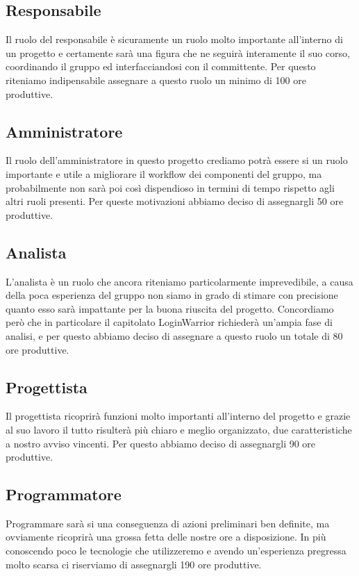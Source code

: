 \subsection{Responsabile}
Il ruolo del responsabile è sicuramente un ruolo molto importante all'interno di un progetto e certamente sarà una figura che ne
seguirà interamente il suo corso, coordinando il gruppo ed interfacciandosi con il committente.
Per questo riteniamo indipensabile assegnare a questo ruolo un minimo di 100 ore produttive. 

\subsection{Amministratore}
Il ruolo dell'amministratore in questo progetto crediamo potrà essere si un ruolo importante e utile a migliorare il workflow dei componenti del gruppo, ma probabilmente non sarà poi così dispendioso
in termini di tempo rispetto agli altri ruoli presenti. Per queste motivazioni abbiamo deciso di assegnargli 50 ore produttive.

\subsection{Analista}
L'analista è un ruolo che ancora riteniamo particolarmente imprevedibile, a causa della poca esperienza del gruppo non siamo in grado di stimare con precisione quanto esso sarà impattante per la buona
riuscita del progetto. Concordiamo però che in particolare il capitolato LoginWarrior richiederà un'ampia fase di analisi, e per questo abbiamo deciso di assegnare a questo ruolo un totale di 80 ore produttive.

\subsection{Progettista}
Il progettista ricoprirà funzioni molto importanti all'interno del progetto e grazie al suo lavoro il tutto risulterà più chiaro e meglio organizzato, due caratteristiche a nostro avviso vincenti.
Per questo abbiamo deciso di assegnargli 90 ore produttive.

\subsection{Programmatore}
Programmare sarà si una conseguenza di azioni preliminari ben definite, ma ovviamente ricoprirà una grossa fetta delle nostre ore a disposizione. In più conoscendo poco le tecnologie che utilizzeremo e avendo
un'esperienza pregressa molto scarsa ci riserviamo di assegnargli 190 ore produttive.

